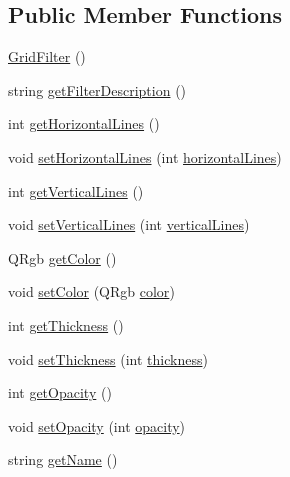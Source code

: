 \subsection*{Public Member Functions}
\begin{DoxyCompactItemize}
\item 
\hyperlink{classModel_1_1GridFilter_ab1ae2f8274ae2f189885458ea8107430}{Grid\+Filter} ()
\item 
string \hyperlink{classModel_1_1GridFilter_a62b7b60e24f92234393b840b35808e06}{get\+Filter\+Description} ()
\item 
int \hyperlink{classModel_1_1GridFilter_abcc18b0863e36589ecfc558674efac58}{get\+Horizontal\+Lines} ()
\item 
void \hyperlink{classModel_1_1GridFilter_a849b1116004a7d70012a0b2b435a654d}{set\+Horizontal\+Lines} (int \hyperlink{classModel_1_1GridFilter_a7036f87b4b74d4ef89ef62d91f7a1db1}{horizontal\+Lines})
\item 
int \hyperlink{classModel_1_1GridFilter_ac85296b9435ef3afd4439122f5251e3e}{get\+Vertical\+Lines} ()
\item 
void \hyperlink{classModel_1_1GridFilter_a19a37598a2c1297a657d072776eb0cda}{set\+Vertical\+Lines} (int \hyperlink{classModel_1_1GridFilter_a654be30b1c42567ae3e92cbe3bf55a5c}{vertical\+Lines})
\item 
Q\+Rgb \hyperlink{classModel_1_1GridFilter_ae697defefbdf5f895406269b15758d91}{get\+Color} ()
\item 
void \hyperlink{classModel_1_1GridFilter_ad858846447f303e473dc8004ef607666}{set\+Color} (Q\+Rgb \hyperlink{classModel_1_1GridFilter_a6e0c08bd2043c82b2e837117d811db91}{color})
\item 
int \hyperlink{classModel_1_1GridFilter_ab6b7bfb33162f992d1bb4e8d6699abef}{get\+Thickness} ()
\item 
void \hyperlink{classModel_1_1GridFilter_ae2faef96ee1277d229d6b6988c66e6d3}{set\+Thickness} (int \hyperlink{classModel_1_1GridFilter_a4ae4bed5e7efe23b97dad176fe6524c3}{thickness})
\item 
int \hyperlink{classModel_1_1GridFilter_a0c8618c617e65d5ab8400704bbc09ed1}{get\+Opacity} ()
\item 
void \hyperlink{classModel_1_1GridFilter_a22b140225648b55b27f2330938ae4006}{set\+Opacity} (int \hyperlink{classModel_1_1GridFilter_ab86f8ec3f0949a133a694bba7f166a05}{opacity})
\item 
string \hyperlink{classModel_1_1GridFilter_a11335e13e50af74108bf926dc1340b4b}{get\+Name} ()
\end{DoxyCompactItemize}
